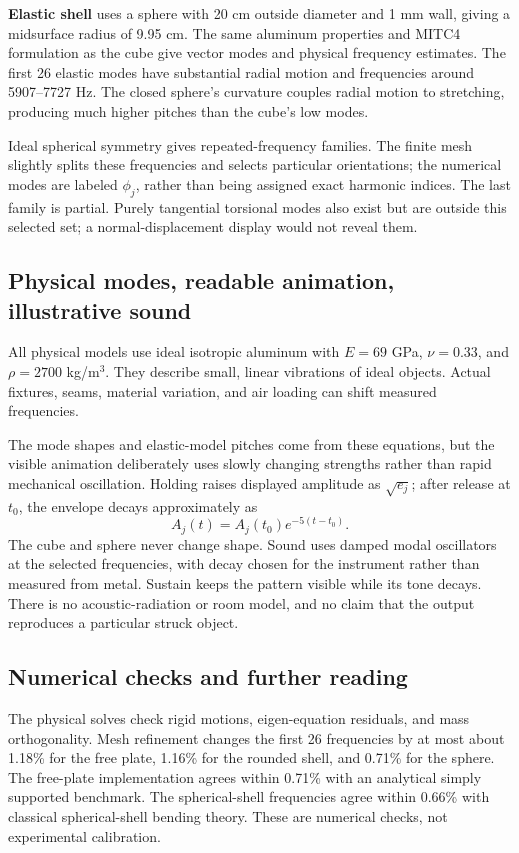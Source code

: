 \documentclass[11pt,letterpaper]{article}
\begin{document}
\textbf{Elastic shell} uses a sphere with 20 cm outside diameter and 1 mm wall, giving a midsurface radius of 9.95 cm. The same aluminum properties and MITC4 formulation as the cube give vector modes and physical frequency estimates. The first 26 elastic modes have substantial radial motion and frequencies around 5907--7727 Hz. The closed sphere's curvature couples radial motion to stretching, producing much higher pitches than the cube's low modes.

Ideal spherical symmetry gives repeated-frequency families. The finite mesh slightly splits these frequencies and selects particular orientations; the numerical modes are labeled \(\phi_j\), rather than being assigned exact harmonic indices. The last family is partial. Purely tangential torsional modes also exist but are outside this selected set; a normal-displacement display would not reveal them.

\subsection{Physical modes, readable animation, illustrative sound}
All physical models use ideal isotropic aluminum with \(E=69\) GPa, \(\nu=0.33\), and \(\rho=2700\) kg/m\(^3\). They describe small, linear vibrations of ideal objects. Actual fixtures, seams, material variation, and air loading can shift measured frequencies.

The mode shapes and elastic-model pitches come from these equations, but the visible animation deliberately uses slowly changing strengths rather than rapid mechanical oscillation. Holding raises displayed amplitude as \(\sqrt{e_j}\); after release at \(t_0\), the envelope decays approximately as
\[
 A_j(t)=A_j(t_0)e^{-5(t-t_0)}.
\]
The cube and sphere never change shape. Sound uses damped modal oscillators at the selected frequencies, with decay chosen for the instrument rather than measured from metal. Sustain keeps the pattern visible while its tone decays. There is no acoustic-radiation or room model, and no claim that the output reproduces a particular struck object.

\subsection{Numerical checks and further reading}
The physical solves check rigid motions, eigen-equation residuals, and mass orthogonality. Mesh refinement changes the first 26 frequencies by at most about 1.18\% for the free plate, 1.16\% for the rounded shell, and 0.71\% for the sphere. The free-plate implementation agrees within 0.71\% with an analytical simply supported benchmark. The spherical-shell frequencies agree within 0.66\% with classical spherical-shell bending theory. These are numerical checks, not experimental calibration.
\end{document}
